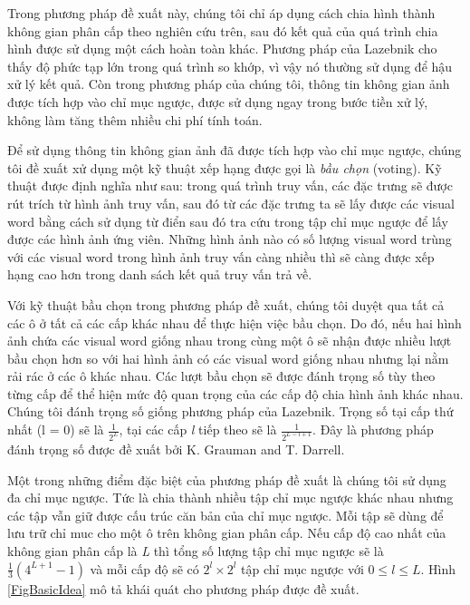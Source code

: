 Trong phương pháp đề xuất này, chúng tôi chỉ áp dụng cách chia hình thành không gian phân cấp theo nghiên cứu trên, sau đó kết quả của quá trình chia hình được sử dụng một cách hoàn toàn khác. Phương pháp của Lazebnik cho thấy độ phức tạp lớn trong quá trình so khớp, vì vậy nó thường sử dụng để hậu xử lý kết quả. Còn trong phương pháp của chúng tôi, thông tin không gian ảnh được tích hợp vào chỉ mục ngược, được sử dụng ngay trong bước tiền xử lý, không làm tăng thêm nhiều chi phí tính toán.

Để sử dụng thông tin không gian ảnh đã được tích hợp vào chỉ mục ngược, chúng tôi đề xuất xử dụng một kỹ thuật xếp hạng được gọi là \textit{bầu chọn} (voting). Kỹ thuật được định nghĩa như sau: trong quá trình truy vấn, các đặc trưng sẽ được rút trích từ hình ảnh truy vấn, sau đó từ các đặc trưng ta sẽ lấy được các visual word bằng cách sử dụng từ điển sau đó tra cứu trong tập chỉ mục ngược để lấy được các hình ảnh ứng viên. Những hình ảnh nào có số lượng visual word trùng với các visual word trong hình ảnh truy vấn càng nhiều thì sẽ càng được xếp hạng cao hơn trong danh sách kết quả truy vấn trả về.

Với kỹ thuật bầu chọn trong phương pháp đề xuất, chúng tôi duyệt qua tất cả các ô ở tất cả các cấp khác nhau để thực hiện việc bầu chọn. Do đó, nếu hai hình ảnh chứa các visual word giống nhau trong cùng một ô sẽ nhận được nhiều lượt bầu chọn hơn so với hai hình ảnh có các visual word giống nhau nhưng lại nằm rải rác ở các ô khác nhau. Các lượt bầu chọn sẽ được đánh trọng số tùy theo từng cấp để thể hiện mức độ quan trọng của các cấp độ chia hình ảnh khác nhau. Chúng tôi đánh trọng số giống phương pháp của Lazebnik\cite{lazebnik2006beyond}. Trọng số tại cấp thứ nhất (l = 0) sẽ là $\frac{1}{2^{L}}$, tại các cấp \textit{l} tiếp theo sẽ là $\frac{1}{2^{L-l+1}}$. Đây là phương pháp đánh trọng số được đề xuất bởi K. Grauman and T. Darrell\cite{grauman2005pyramid}.

Một trong những điểm đặc biệt của phương pháp đề xuất là chúng tôi sử dụng đa chỉ mục ngược. Tức là chia thành nhiều tập chỉ mục ngược khác nhau nhưng các tập vẫn giữ được cấu trúc căn bản của chỉ mục ngược. Mỗi tập sẽ dùng để lưu trữ chỉ muc cho một ô trên không gian phân cấp. Nếu cấp độ cao nhất của không gian phân cấp là \textit{L} thì tổng số lượng tập chỉ mục ngược sẽ là $\frac{1}{3}(4^{L+1} - 1)$ và mỗi cấp độ sẽ có $2^l \times 2^l$ tập chỉ mục ngược với $0 \leq l \leq L$. Hình \ref{FigBasicIdea} mô tả khái quát cho phương pháp được đề xuất.

